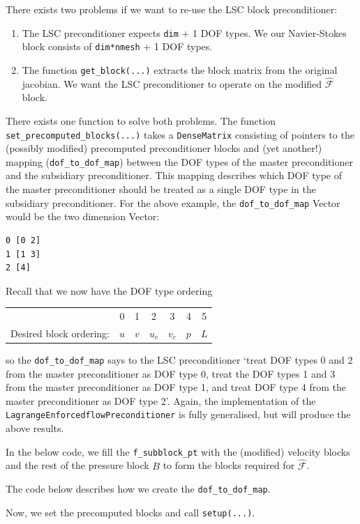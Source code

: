 There exists two problems if we want to re-use the LSC block preconditioner:
\begin{enumerate}
\item The LSC preconditioner expects \verb+dim+ + 1 DOF types. We our Navier-Stokes block consists of \verb+dim*nmesh+ + 1 DOF types.
\item The function \verb+get_block(...)+ extracts the block matrix from the original jacobian. We want the LSC preconditioner to operate on the modified $\hat{\mathcal{F}}$ block.
\end{enumerate}
There exists one function to solve both problems. The function \verb+set_precomputed_blocks(...)+ takes a \verb+DenseMatrix+ consisting of pointers to the (possibly modified) precomputed preconditioner blocks and (yet another!) mapping (\verb+dof_to_dof_map+) between the DOF types of the master preconditioner and the subsidiary preconditioner. This mapping describes which DOF type of the master preconditioner should be treated as a single DOF type in the subsidiary preconditioner.
For the above example, the \verb+dof_to_dof_map+ Vector would be the two dimension Vector:
\begin{verbatim}
0 [0 2]
1 [1 3]
2 [4]
\end{verbatim}
Recall that we now have the DOF type ordering
\begin{center}
    \begin{tabular}{ | r | c c c c c c |}
    \hline
                        & 0   &  1  &  2  &   3    &   4   &  5  \\ 
Desired block ordering: & $u$ & $v$ & $u_c$ & $v_c$& $p$   & $L$ \\ 
    \hline
    \end{tabular}
\end{center}
so the \verb+dof_to_dof_map+ says to the LSC preconditioner `treat DOF types 0 and 2 from the master preconditioner as DOF type 0, treat the DOF types 1 and 3 from the master preconditioner as DOF type 1, and treat DOF type 4 from the master preconditioner as DOF type 2'. Again, the implementation of the \verb+LagrangeEnforcedflowPreconditioner+ is fully generalised, but will produce the above results.

In the below code, we fill the \verb+f_subblock_pt+ with the (modified) velocity blocks and the rest of the pressure block $B$ to form the blocks required for $\hat{\mathcal{F}}$.

The code below describes how we create the \verb+dof_to_dof_map+.

Now, we set the precomputed blocks and call \verb+setup(...)+.


